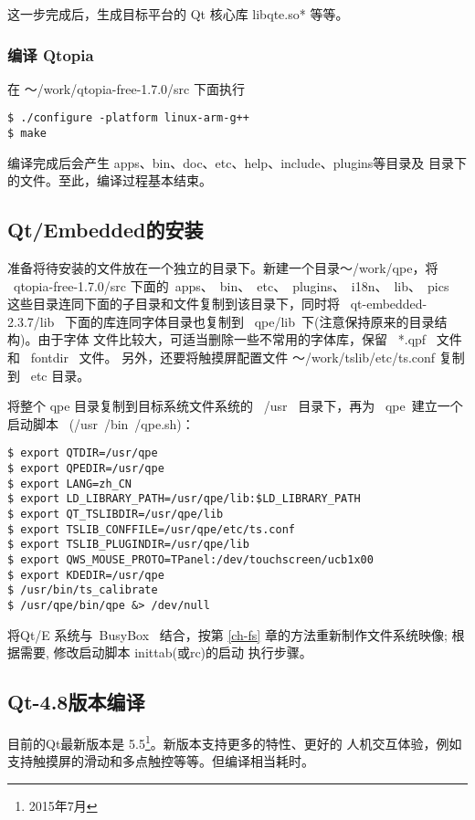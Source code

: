 	这一步完成后，生成目标平台的 Qt 核心库 libqte.so* 等等。

\subsubsection{编译 Qtopia}
	在 ～/work/qtopia-free-1.7.0/src 下面执行

\begin{boxedminipage}{.9\textwidth}
\begin{verbatim} 
$ ./configure -platform linux-arm-g++
$ make
\end{verbatim}
\end{boxedminipage}

	编译完成后会产生 apps、bin、doc、etc、help、include、plugins等目录及
目录下的文件。至此，编译过程基本结束。

\subsection{Qt/Embedded的安装}
	准备将待安装的文件放在一个独立的目录下。新建一个目录～/work/qpe，将
~qtopia-free-1.7.0/src 下面的~apps、~bin、~etc、~plugins、~i18n、~lib、~pics~
这些目录连同下面的子目录和文件复制到该目录下，同时将 ~qt-embedded-2.3.7/lib~
下面的库连同字体目录也复制到 ~qpe/lib~下(注意保持原来的目录结构)。由于字体
文件比较大，可适当删除一些不常用的字体库，保留 ~*.qpf~ 文件和 ~fontdir~ 文件。
另外，还要将触摸屏配置文件 ～/work/tslib/etc/ts.conf 复制到 ~etc 目录。

	将整个 qpe 目录复制到目标系统文件系统的 ~/usr~ 目录下，再为 ~qpe~建立一个
启动脚本 ~(/usr~/bin~/qpe.sh)：

\begin{boxedminipage}{.9\textwidth}
\begin{verbatim} 
$ export QTDIR=/usr/qpe
$ export QPEDIR=/usr/qpe
$ export LANG=zh_CN
$ export LD_LIBRARY_PATH=/usr/qpe/lib:$LD_LIBRARY_PATH
$ export QT_TSLIBDIR=/usr/qpe/lib
$ export TSLIB_CONFFILE=/usr/qpe/etc/ts.conf
$ export TSLIB_PLUGINDIR=/usr/qpe/lib
$ export QWS_MOUSE_PROTO=TPanel:/dev/touchscreen/ucb1x00
$ export KDEDIR=/usr/qpe
$ /usr/bin/ts_calibrate
$ /usr/qpe/bin/qpe &> /dev/null
\end{verbatim}
\end{boxedminipage}

	将Qt/E 系统与~BusyBox~ 结合，按第{} \ref{ch-fs}
章的方法重新制作文件系统映像; 根据需要, 修改启动脚本 inittab(或rc)的启动
执行步骤。

\subsection{Qt-4.8版本编译}
目前的Qt最新版本是 5.5\footnote{2015年7月}。新版本支持更多的特性、更好的
人机交互体验，例如支持触摸屏的滑动和多点触控等等。但编译相当耗时。

